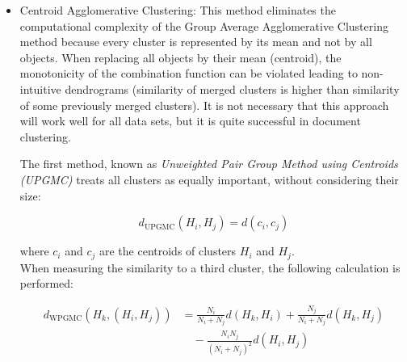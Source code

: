 \documentclass[11pt,openany,executivepaper]{book}
\begin{document}
\begin{itemize}
    When $H_i$ and $H_j$ are merged, the distance to a third cluster, $H_k$, can be calculated as follows:

    \begin{equation}
        d_{\text{UPGMA}}(H_k, (H_i, H_j)) =
        \frac{1}{2} \left( d(H_k, H_i) + d(H_k, H_j) \right)
    \end{equation}

    Information about the sizes of merged clusters is thus lost. In the
    \textit{Weighted Pair-Group Method using Arithmetic averages (WPGMA)}, the distances are weighted according to the number of objects in each cluster (bigger clusters are down-weighted):

    \begin{equation}
        d_{\text{WPGMA}}(H_k, (H_i, H_j)) =
        \frac{N_i}{N_i + N_k} d(H_k, H_i) +
        \frac{N_j}{N_j + N_k} d(H_k, H_j)
    \end{equation}

    \item Centroid Agglomerative Clustering: This method eliminates the computational complexity of the Group Average Agglomerative Clustering method because every cluster is represented by its mean and not by all objects. When replacing all objects by their mean (centroid), the monotonicity of the combination function can be violated leading to non-intuitive dendrograms (similarity of merged clusters is higher than similarity of some previously merged clusters). It is not necessary that this approach will work well for all data sets, but it is quite successful in document clustering.

    The first method, known as \textit{Unweighted Pair Group Method using Centroids (UPGMC)} treats all clusters as equally important, without considering their size:

    \begin{equation}
        d_{\text{UPGMC}}(H_i, H_j) = d(c_i, c_j)
    \end{equation}

    where $c_i$ and $c_j$ are the centroids of clusters $H_i$ and $H_j$.\\

When measuring the similarity to a third cluster, the following calculation is performed:

\begin{equation}
\begin{aligned}
d_{\text{WPGMC}}(H_k, (H_i, H_j)) &=
\frac{N_i}{N_i + N_j} d(H_k, H_i)
+ \frac{N_j}{N_i + N_j} d(H_k, H_j) \\
&\quad - \frac{N_i N_j}{(N_i + N_j)^2} d(H_i, H_j)
\end{aligned}
\end{equation}


\end{itemize}
\end{document}

